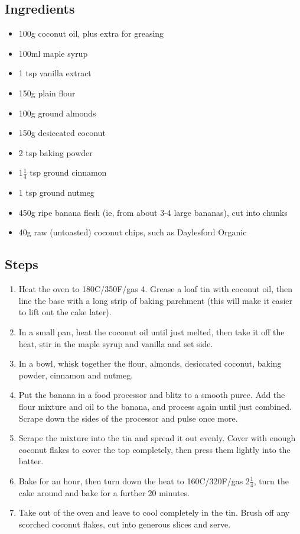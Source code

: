 \documentclass{book}
\begin{document}
\subsection*{Ingredients}
\begin{itemize}
\item 100g coconut oil, plus extra for greasing
\item 100ml maple syrup
\item 1 tsp vanilla extract 
\item 150g plain flour 
\item 100g ground almonds
\item 150g desiccated coconut 
\item 2 tsp baking powder 
\item 1$\frac{1}{4}$ tsp ground cinnamon 
\item 1 tsp ground nutmeg 
\item 450g ripe banana flesh (ie, from about 3-4 large bananas), cut into chunks 
\item 40g raw (untoasted) coconut chips, such as Daylesford Organic
\end{itemize}

\subsection*{Steps}
\begin{enumerate}
\item Heat the oven to 180C/350F/gas 4. Grease a loaf tin with coconut oil, then line the base with a long strip of baking parchment (this will make it easier to lift out the cake later).
\item In a small pan, heat the coconut oil until just melted, then take it off the heat, stir in the maple syrup and vanilla and set side.
\item In a bowl, whisk together the flour, almonds, desiccated coconut, baking powder, cinnamon and nutmeg.
\item Put the banana in a food processor and blitz to a smooth puree. Add the flour mixture and oil to the banana, and process again until just combined. Scrape down the sides of the processor and pulse once more.
\item Scrape the mixture into the tin and spread it out evenly. Cover with enough coconut flakes to cover the top completely, then press them lightly into the batter.
\item Bake for an hour, then turn down the heat to 160C/320F/gas 2$\frac{1}{4}$, turn the cake around and bake for a further 20 minutes.
\item Take out of the oven and leave to cool completely in the tin. Brush off any scorched coconut flakes, cut into generous slices and serve.
\end{enumerate}
\newpage
\end{document}
